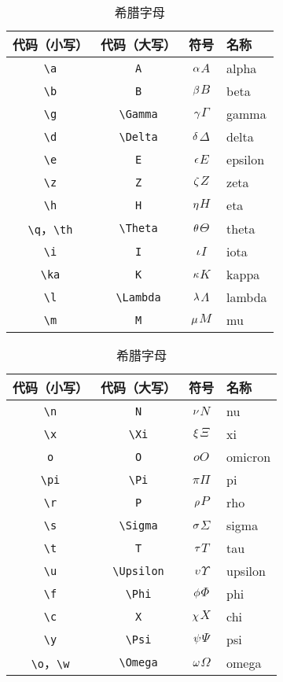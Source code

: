 \documentclass[shortmath]{AirNote}
\begin{document}
\begin{table}[htb]

\centering
\begin{tabular}{cccl}
\toprule
代码（小写） & 代码（大写） & 符号 & 名称\\
\midrule
\verb|\a| & \verb|A| & $\alpha$\quad$A$ & alpha\\
\verb|\b| & \verb|B| & $\beta$\quad$B$ & beta\\
\verb|\g| & \verb|\Gamma| & $\gamma$\quad$\Gamma$ & gamma\\
\verb|\d| & \verb|\Delta| & $\delta$\quad$\Delta$ & delta\\
\verb|\e| & \verb|E| & $\epsilon$\quad$E$ & epsilon\\
\verb|\z| & \verb|Z| & $\zeta$\quad$Z$ & zeta\\
\verb|\h| & \verb|H| & $\eta$\quad$H$ & eta\\
\verb|\q|，\verb|\th| & \verb|\Theta| & $\theta$\quad$\Theta$ & theta\\
\verb|\i| & \verb|I| & $\iota$\quad$I$ & iota\\
\verb|\ka| & \verb|K| & $\kappa$\quad$K$ & kappa\\
\verb|\l| & \verb|\Lambda| & $\lambda$\quad$\Lambda$ & lambda\\
\verb|\m| & \verb|M| & $\mu$\quad$M$ & mu\\
\bottomrule
\end{tabular}
\quad
\begin{tabular}{cccl}
\toprule
代码（小写） & 代码（大写） & 符号 & 名称\\
\midrule
\verb|\n| & \verb|N| & $\nu$\quad$N$ & nu\\
\verb|\x| & \verb|\Xi| & $\xi$\quad$\Xi$ & xi\\
\verb|o| & \verb|O| & $o$\quad$O$ & omicron\\
\verb|\pi| & \verb|\Pi| & $\pi$\quad$\Pi$ & pi\\
\verb|\r| & \verb|P| & $\rho$\quad$P$ & rho\\
\verb|\s| & \verb|\Sigma| & $\sigma$\quad$\Sigma$ & sigma\\
\verb|\t| & \verb|T| & $\tau$\quad$T$ & tau\\
\verb|\u| & \verb|\Upsilon| & $\upsilon$\quad$\Upsilon$ & upsilon\\
\verb|\f| & \verb|\Phi| & $\phi$\quad$\Phi$ & phi\\
\verb|\c| & \verb|X| & $\chi$\quad$X$ & chi\\
\verb|\y| & \verb|\Psi| & $\psi$\quad$\Psi$ & psi\\
\verb|\o|，\verb|\w| & \verb|\Omega| & $\omega$\quad$\Omega$ & omega\\
\bottomrule
\end{tabular}

\caption{希腊字母}
\end{table}
\end{document}
